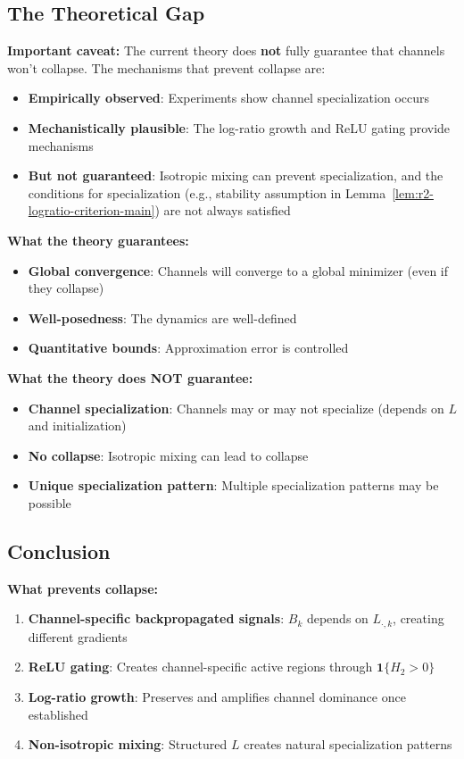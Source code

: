 \subsection{The Theoretical Gap}

\textbf{Important caveat:} The current theory does \textbf{not} fully guarantee that channels won't collapse. The mechanisms that prevent collapse are:

\begin{itemize}
\item \textbf{Empirically observed}: Experiments show channel specialization occurs
\item \textbf{Mechanistically plausible}: The log-ratio growth and ReLU gating provide mechanisms
\item \textbf{But not guaranteed}: Isotropic mixing can prevent specialization, and the conditions for specialization (e.g., stability assumption in Lemma~\ref{lem:r2-logratio-criterion-main}) are not always satisfied
\end{itemize}

\textbf{What the theory guarantees:}
\begin{itemize}
\item \textbf{Global convergence}: Channels will converge to a global minimizer (even if they collapse)
\item \textbf{Well-posedness}: The dynamics are well-defined
\item \textbf{Quantitative bounds}: Approximation error is controlled
\end{itemize}

\textbf{What the theory does NOT guarantee:}
\begin{itemize}
\item \textbf{Channel specialization}: Channels may or may not specialize (depends on $L$ and initialization)
\item \textbf{No collapse}: Isotropic mixing can lead to collapse
\item \textbf{Unique specialization pattern}: Multiple specialization patterns may be possible
\end{itemize}

\subsection{Conclusion}

\textbf{What prevents collapse:}
\begin{enumerate}
\item \textbf{Channel-specific backpropagated signals}: $B_k$ depends on $L_{\cdot,k}$, creating different gradients
\item \textbf{ReLU gating}: Creates channel-specific active regions through $\mathbf{1}\{H_2 > 0\}$
\item \textbf{Log-ratio growth}: Preserves and amplifies channel dominance once established
\item \textbf{Non-isotropic mixing}: Structured $L$ creates natural specialization patterns
\end{enumerate}

